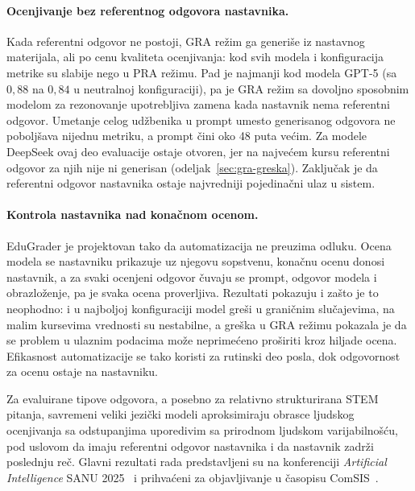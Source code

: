 \paragraph{Ocenjivanje bez referentnog odgovora nastavnika.}
Kada referentni odgovor ne postoji, GRA režim ga generiše iz nastavnog materijala, ali po cenu kvaliteta ocenjivanja:
kod svih modela i konfiguracija metrike su slabije nego u PRA režimu.
Pad je najmanji kod modela GPT-5 (sa $0{,}88$ na $0{,}84$ u neutralnoj konfiguraciji),
pa je GRA režim sa dovoljno sposobnim modelom za rezonovanje upotrebljiva zamena kada nastavnik nema referentni odgovor.
Umetanje celog udžbenika u prompt umesto generisanog odgovora ne poboljšava nijednu metriku, a prompt čini oko 48 puta većim.
Za modele DeepSeek ovaj deo evaluacije ostaje otvoren,
jer na najvećem kursu referentni odgovor za njih nije ni generisan (odeljak~\ref{sec:gra-greska}).
Zaključak je da referentni odgovor nastavnika ostaje najvredniji pojedinačni ulaz u sistem.

\paragraph{Kontrola nastavnika nad konačnom ocenom.}
EduGrader je projektovan tako da automatizacija ne preuzima odluku.
Ocena modela se nastavniku prikazuje uz njegovu sopstvenu, konačnu ocenu donosi nastavnik,
a za svaki ocenjeni odgovor čuvaju se prompt, odgovor modela i obrazloženje, pa je svaka ocena proverljiva.
Rezultati pokazuju i zašto je to neophodno: i u najboljoj konfiguraciji model greši u graničnim slučajevima,
na malim kursevima vrednosti su nestabilne, a greška u GRA režimu pokazala je da se
problem u ulaznim podacima može neprimećeno proširiti kroz hiljade ocena.
Efikasnost automatizacije se tako koristi za rutinski deo posla, dok odgovornost za ocenu ostaje na nastavniku.

Za evaluirane tipove odgovora, a posebno za relativno strukturirana STEM pitanja,
savremeni veliki jezički modeli aproksimiraju obrasce ljudskog ocenjivanja sa odstupanjima uporedivim sa prirodnom ljudskom varijabilnošću,
pod uslovom da imaju referentni odgovor nastavnika i da nastavnik zadrži poslednju reč.
Glavni rezultati rada predstavljeni su na konferenciji \emph{Artificial Intelligence} SANU 2025~\cite{ikovic2025edugraderconf}
i prihvaćeni za objavljivanje u časopisu ComSIS~\cite{ikovic2025edugrader}.
